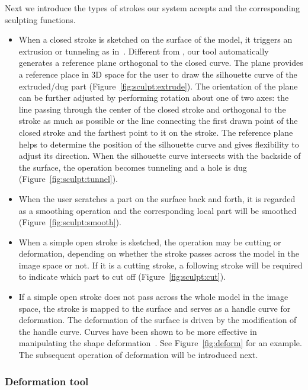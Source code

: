Next we introduce the types of strokes our system accepts and 
the corresponding sculpting functions.

\begin{itemize}
\item When a closed stroke is sketched on the
surface of the model, it triggers an extrusion or tunneling as
in~\cite{IMT99,NISA07}. Different from \cite{IMT99,NISA07}, our tool
automatically generates a reference plane orthogonal to the closed
curve. The plane provides a reference place in 3D space for the user
to draw the silhouette curve of the extruded/dug part
(Figure~\ref{fig:sculpt:extrude}). The orientation of the plane can
be further adjusted by performing rotation about one of two axes:
the line passing through the center of the closed stroke and
orthogonal to the stroke as much as possible or the line connecting
the first drawn point of the closed stroke and the farthest point to
it on the stroke. The reference plane helps to determine the
position of the silhouette curve and gives flexibility to adjust its
direction. When the silhouette curve intersects with the backside of
the surface, the operation becomes tunneling and a hole is dug
(Figure~\ref{fig:sculpt:tunnel}).

\item When the user scratches a part on the surface back and forth, it
is regarded as a smoothing operation and the corresponding local
part will be smoothed (Figure~\ref{fig:sculpt:smooth}).


\item When a simple open stroke is sketched, the operation may be
cutting or deformation, depending on whether the stroke passes
across the model in the image space or not. If it is a cutting
stroke, a following stroke will be required to indicate which part
to cut off (Figure~\ref{fig:sculpt:cut}).

\item If a simple open stroke does not pass across the whole model in the image space,
the stroke is mapped to the surface and serves as a handle curve for
deformation. The deformation of the surface is driven by the
modification of the handle curve. Curves have been shown to be more
effective in manipulating the shape deformation~\cite{NISA07}. See
Figure~\ref{fig:deform} for an example. The subsequent
operation of deformation will be introduced next.
\end{itemize}



\subsubsection{Deformation tool}
\label{ch3:sec:ui:sculpt:deform}

